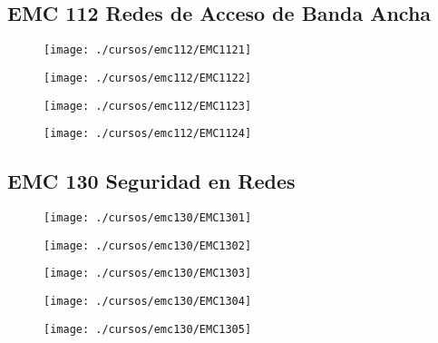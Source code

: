 \subsection{EMC 112 Redes de Acceso de Banda Ancha}



\begin{figure}[!ht]
    \centering
    \texttt{[image: ./cursos/emc112/EMC1121]}
\end{figure}
\clearpage

\begin{figure}[!ht]
    \centering
    \texttt{[image: ./cursos/emc112/EMC1122]}
\end{figure}
\clearpage

\begin{figure}[!ht]
    \centering
    \texttt{[image: ./cursos/emc112/EMC1123]}
\end{figure}
\clearpage

\begin{figure}[!ht]
    \centering
    \texttt{[image: ./cursos/emc112/EMC1124]}
\end{figure}
\clearpage



\subsection{EMC 130 Seguridad en Redes} 



\begin{figure}[!ht]
    \centering
    \texttt{[image: ./cursos/emc130/EMC1301]}
\end{figure}
\clearpage

\begin{figure}[!ht]
    \centering
    \texttt{[image: ./cursos/emc130/EMC1302]}
\end{figure}
\clearpage

\begin{figure}[!ht]
    \centering
    \texttt{[image: ./cursos/emc130/EMC1303]}
\end{figure}
\clearpage

\begin{figure}[!ht]
    \centering
    \texttt{[image: ./cursos/emc130/EMC1304]}
\end{figure}
\clearpage

\begin{figure}[!ht]
    \centering
    \texttt{[image: ./cursos/emc130/EMC1305]}
\end{figure}
\clearpage

